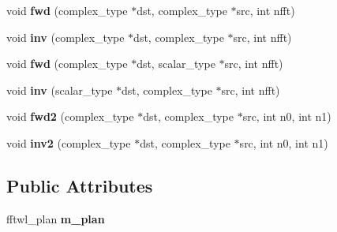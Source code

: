\begin{DoxyCompactItemize}
void {\bfseries fwd} (complex\+\_\+type $\ast$dst, complex\+\_\+type $\ast$src, int nfft)
\item 
\mbox{\label{struct_eigen_1_1internal_1_1fftw__plan_3_01long_01double_01_4_aa1107ed22a7c71ba282eb6879ed36310}} 
void {\bfseries inv} (complex\+\_\+type $\ast$dst, complex\+\_\+type $\ast$src, int nfft)
\item 
\mbox{\label{struct_eigen_1_1internal_1_1fftw__plan_3_01long_01double_01_4_a5c0056e14380d16029aa3063cf4b4e1f}} 
void {\bfseries fwd} (complex\+\_\+type $\ast$dst, scalar\+\_\+type $\ast$src, int nfft)
\item 
\mbox{\label{struct_eigen_1_1internal_1_1fftw__plan_3_01long_01double_01_4_a244be09f7fb66aeaa325d33f760c2248}} 
void {\bfseries inv} (scalar\+\_\+type $\ast$dst, complex\+\_\+type $\ast$src, int nfft)
\item 
\mbox{\label{struct_eigen_1_1internal_1_1fftw__plan_3_01long_01double_01_4_a237259a8eab474291fe97e27a86b18c2}} 
void {\bfseries fwd2} (complex\+\_\+type $\ast$dst, complex\+\_\+type $\ast$src, int n0, int n1)
\item 
\mbox{\label{struct_eigen_1_1internal_1_1fftw__plan_3_01long_01double_01_4_a15dfec869ac1461cd0764e366d61180e}} 
void {\bfseries inv2} (complex\+\_\+type $\ast$dst, complex\+\_\+type $\ast$src, int n0, int n1)
\end{DoxyCompactItemize}
\subsection*{Public Attributes}
\begin{DoxyCompactItemize}
\item 
\mbox{\label{struct_eigen_1_1internal_1_1fftw__plan_3_01long_01double_01_4_aa789657d515d5cd2af08a50743381bf7}} 
fftwl\+\_\+plan {\bfseries m\+\_\+plan}
\end{DoxyCompactItemize}


